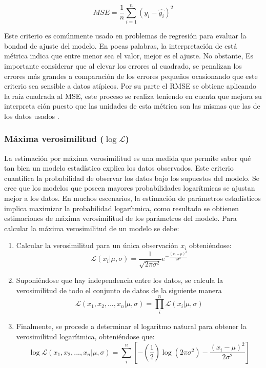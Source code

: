 \begin{equation}
    MSE = \frac{1}{n} \sum_{i=1}^{n}(y_{i}-\hat{y_{i}})^{2}
\end{equation}

Este criterio es comúnmente usado en problemas de regresión para evaluar la bondad de ajuste del modelo. En pocas palabras, la interpretación de está métrica indica que entre menor sea el valor, mejor es el ajuste. No obstante, Es importante considerar que al elevar los errores al cuadrado, se penalizan los errores más grandes a comparación de los errores pequeños ocasionando que este criterio sea sensible a datos atípicos. Por su parte el RMSE se obtiene aplicando la raíz  cuadrada al MSE, este proceso se realiza teniendo en cuenta que mejora su interpreta ción puesto que las unidades de esta métrica son las mismas que las de los datos usados \cite{msereg}.

\subsubsection{Máxima verosimilitud ($\log \mathcal{L}$)}

La estimación por máxima verosimilitud es una medida que permite saber qué tan bien un modelo estadístico explica los datos observados. Este criterio cuantifica la probabilidad de observar los datos bajo los supuestos del modelo. Se cree que los modelos que poseen mayores probabilidades logarítmicas se ajustan mejor a los datos. En muchos escenarios, la estimación de parámetros estadísticos implica maximizar la probabilidad logarítmica, como resultado se obtienen estimaciones de máxima verosimilitud de los parámetros del modelo. Para calcular la máxima verosimilitud de un modelo se debe:
\begin{enumerate}
    \item Calcular la verosimilitud para un única observación $x_{i}$ obteniéndose:
    \begin{equation*}
        \mathcal{L}(x_{i}|\mu,\sigma) = \frac{1}{\sqrt{2\pi\sigma^{2}}} e^{-\frac{(x_{i}-\mu)^{2}}{2\sigma^{2}}}
    \end{equation*}
    \item Suponiéndose que hay independencia entre los datos, se calcula la verosimilitud de todo el conjunto de datos de la siguiente manera
    \begin{equation*}
        \mathcal{L}(x_{1},x_{2},...,x_{n}|\mu,\sigma) = \prod_{i}^{n}\mathcal{L}(x_{i}|\mu,\sigma)
    \end{equation*}
    \item Finalmente, se procede a determinar el logaritmo natural para obtener la verosimilitud logarítmica, obteniéndose que:
    \begin{equation}
        \log\mathcal{L}(x_{1},x_{2},...,x_{n}|\mu,\sigma) = \sum_{i}^{n}\left[-\left(\frac{1}{2}\right)\log(2\pi\sigma^{2})-\frac{(x_{i}-\mu)^{2}}{2\sigma^{2}}\right]
    \end{equation}
\end{enumerate}

